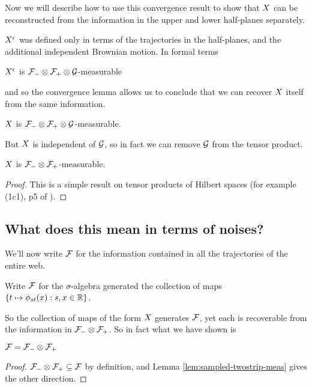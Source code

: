 {Now we will describe how to use this convergence result to show that
$X$ can be reconstructed from the information in the upper and
lower half-planes separately.

$X^{\epsilon}$ was defined only in terms of the trajectories in the
half-planes, and the additional independent Brownian
motion.  In formal terms

\begin{obs}
  $X^{\epsilon}$ is $\mathcal{F}_{-} \otimes \mathcal{F}_{+} \otimes \mathcal{G}$-measurable
\end{obs}

and so the convergence lemma allows us to conclude that we can
recover $X$ itself from the same information.

\begin{cor}
  \label{cor:sampled-twostripsreservoir-meas}
  $X$ is $\mathcal{F}_{-} \otimes \mathcal{F}_{+} \otimes \mathcal{G}$-measurable.
\end{cor}
  
But $X$ is independent of $\mathcal{G}$, so in fact we can
remove $\mathcal{G}$ from the tensor product.

\begin{lemma}
  \label{lem:sampled-twostrip-meas}
  $X$ is $\mathcal{F}_{-} \otimes \mathcal{F}_{+}$-measurable.
\end{lemma}

\begin{proof}
  This is a simple result on tensor products of
  Hilbert spaces (for example (1c1), p5 of
  \cite{tsirelson-completion}).
\end{proof}

\subsection{What does this mean in terms of noises?}

We'll now write $\mathcal{F}$ for the information contained in all the
trajectories of the entire web.

\begin{definition}
  Write $\mathcal{F}$ for the $\sigma$-algebra generated the
  collection of maps $\{ t \mapsto \phi_{{s}{t}}(x) : s,x \in \mathbb{R} \}$.
\end{definition}

So the collection of maps of the form $X$ generates
$\mathcal{F}$, yet each is recoverable from the information in
$\mathcal{F}_{-} \otimes \mathcal{F}_{+}$.  So in fact what we have shown is

\begin{theorem}
  $\mathcal{F} = \mathcal{F}_{-} \otimes \mathcal{F}_{+}$
\end{theorem}

\begin{proof}
  $\mathcal{F}_{-} \otimes \mathcal{F}_{+} \subseteq \mathcal{F}$ by definition, and Lemma
  \ref{lem:sampled-twostrip-meas} gives the other direction.
\end{proof}
}
